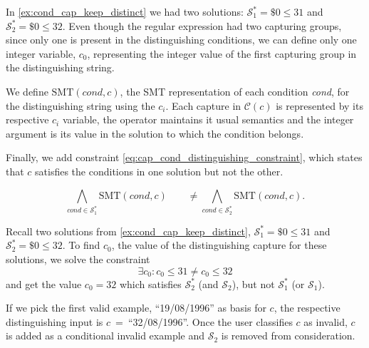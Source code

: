 \begin{example}
In \autoref{ex:cond_cap_keep_distinct} we had two solutions: \(\mathcal{S}_1^* = \$0 \le 31\) and \(\mathcal{S}_2^* = \$0 \le 32\). Even though the regular expression had two capturing groups, since only one is present in the distinguishing conditions, we can define only one integer variable, \(c_0\), representing the integer value of the first capturing group in the distinguishing string.
\end{example}

We define \(\textrm{SMT}(\textit{cond}, c)\), the \ac{SMT} representation of each condition \textit{cond}, for the distinguishing string using the \(c_i\). Each capture in \(\mathcal{C}(c)\) is represented by its respective \(c_i\) variable, the operator maintains it usual semantics and the integer argument is its value in the solution to which the condition belongs.

Finally, we add constraint \eqref{eq:cap_cond_distinguishing_constraint}, which states that \(c\) satisfies the conditions in one solution but not the other.

\begin{equation}\label{eq:cap_cond_distinguishing_constraint}
    \bigwedge_{\textit{cond} \in \mathcal{S}_1^*} \textrm{SMT}(\textit{cond}, c) \qquad\ne \bigwedge_{\textit{cond} \in \mathcal{S}_2^*} \textrm{SMT}(\textit{cond}, c).
\end{equation}

\begin{example}
Recall two solutions from \autoref{ex:cond_cap_keep_distinct}, \(\mathcal{S}_1^* = \$0 \le 31\) and \(\mathcal{S}_2^* = \$0 \le 32\). To find \(c_0\), the value of the distinguishing capture for these solutions, we solve the constraint
\begin{equation*}
    \exists c_0 : c_0 \le 31 \ne c_0 \le 32
\end{equation*}
and get the value \(c_0 = 32\) which satisfies \(\mathcal{S}_2^*\) (and \(\mathcal{S}_2\)), but not \(\mathcal{S}_1^*\) (or \(\mathcal{S}_1\)).

If we pick the first valid example, ``19/08/1996'' as basis for \(c\), the respective distinguishing input is \(c\)~=~``32/08/1996''. Once the user classifies \(c\) as invalid, \(c\) is added as a conditional invalid example and \(\mathcal{S}_2\) is removed from consideration.
\end{example}

